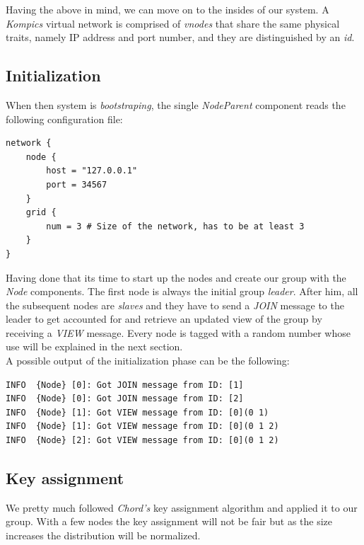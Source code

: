 \documentclass[a4paper, 11pt]{article}
\begin{document}
\noindent Having the above in mind, we can move on to the insides of our system. A \textit{Kompics} virtual network is comprised of \textit{vnodes} that share the same physical traits, namely IP address and port number, and they are distinguished by an \textit{id}. \\

\subsection{Initialization}

\noindent When then system is \textit{bootstraping}, the single \textit{NodeParent} component reads the following configuration file: 

\begin{verbatim}
network {
    node {
        host = "127.0.0.1"
        port = 34567
    }
    grid {
        num = 3 # Size of the network, has to be at least 3
    }
}
\end{verbatim}

\noindent Having done that its time to start up the nodes and create our group with the \textit{Node} components. The first node is always the initial group \textit{leader}. After him, all the subsequent nodes are \textit{slaves} and they have to send a \textit{JOIN} message to the leader to get accounted for and retrieve an updated view of the group by receiving a \textit{VIEW} message. Every node is tagged with a random number whose use will be explained in the next section. \\

\noindent A possible output of the initialization phase can be the following:

\begin{verbatim}
INFO  {Node} [0]: Got JOIN message from ID: [1]
INFO  {Node} [0]: Got JOIN message from ID: [2]
INFO  {Node} [1]: Got VIEW message from ID: [0](0 1)
INFO  {Node} [1]: Got VIEW message from ID: [0](0 1 2)
INFO  {Node} [2]: Got VIEW message from ID: [0](0 1 2)
\end{verbatim}

\subsection{Key assignment}

\noindent We pretty much followed \textit{Chord's} key assignment algorithm and applied it to our group. With a few nodes the key assignment will not be fair but as the size increases the distribution will be normalized.
\end{document}
